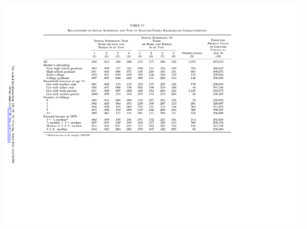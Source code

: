 \begin{frame}
\begin{center}
	\includegraphics{tab-figs/table13_1997_footer}	
	\end{center}
\end{frame}

